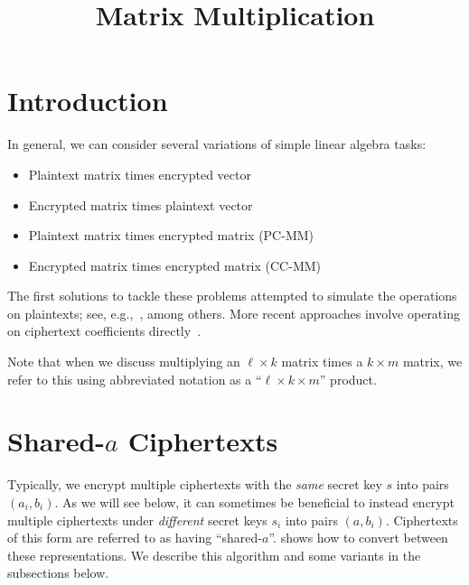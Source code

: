\documentclass[../fheimpl.tex]{subfiles}
\begin{document}
\ifcompileasbook
\else
	\title{Matrix Multiplication}
	\hypersetup{pageanchor=false}
	\maketitle
	\listoffixmes
	\tableofcontents
	\compileasbooktrue
	\hypersetup{pageanchor=true}
\fi

\section{Introduction}
In general, we can consider several variations of simple linear algebra tasks:
\begin{itemize}
	\item Plaintext matrix times encrypted vector
	\item Encrypted matrix times plaintext vector
	\item Plaintext matrix times encrypted matrix (PC-MM)
	\item Encrypted matrix times encrypted matrix (CC-MM)
\end{itemize}

The first solutions to tackle these problems attempted to simulate the operations on plaintexts; see, e.g.,~\cite{cryptoeprint:2014/106, cryptoeprint:2018/1041, cryptoeprint:2020/1483, 10.5555/3618408.3619194, cryptoeprint:2025/1367}, among others. More recent approaches involve operating on ciphertext coefficients directly~\cite{cryptoeprint:2024/1284, cryptoeprint:2025/448, cryptoeprint:2025/1935, cryptoeprint:2025/1957}.

Note that when we discuss multiplying an $\ell\times k$ matrix times a $k\times m$ matrix, we refer to this using abbreviated notation as a ``$\ell\times k\times m$'' product.

\section{Shared-$a$ Ciphertexts}
\label{sec:format-switching}
Typically, we encrypt multiple ciphertexts with the \emph{same} secret key $s$ into pairs $(a_i, b_i)$. As we will see below, it can sometimes be beneficial to instead encrypt multiple ciphertexts under \emph{different} secret keys $s_i$ into pairs $(a, b_i)$. Ciphertexts of this form are referred to as having ``shared-$a$''. \cite{cryptoeprint:2024/1284} shows how to convert between these representations. We describe this algorithm and some variants in the subsections below.
\end{document}
